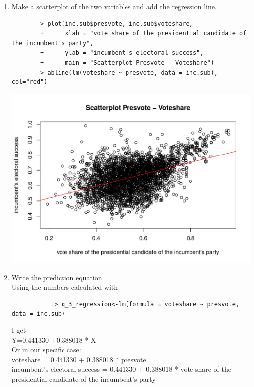\documentclass[12pt,letterpaper]{article}
\begin{document}
\begin{enumerate}
		\item Make a scatterplot of the two variables and add the regression line. \\
		\begin{verbatim}
		> plot(inc.sub$presvote, inc.sub$voteshare,
		+      xlab = "vote share of the presidential candidate of the incumbent's party",
		+      ylab = "incumbent's electoral success",
		+      main = "Scatterplot Presvote - Voteshare")
		> abline(lm(voteshare ~ presvote, data = inc.sub), col="red")
			\end{verbatim} \includegraphics[width=\textwidth,height=\textheight,keepaspectratio]{Q_3_Plot}
		\item Write the prediction equation.\\
		
		Using the numbers calculated with
		\begin{verbatim}
			> q_3_regression<-lm(formula = voteshare ~ presvote, data = inc.sub)
		\end{verbatim}
		I get \\
		Y=0.441330 +0.388018 * X \\
		Or in our specific case: \\
		voteshare = 0.441330 + 0.388018 * presvote \\
		incumbent's electoral success = 0.441330 + 0.388018  * vote share of the presidential candidate of the incumbent's party
	
	\end{enumerate}
	

\newpage	
\end{document}
